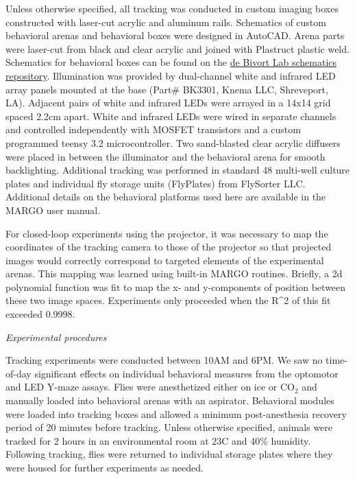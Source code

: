 \documentclass[10pt]{article}
\begin{document}
\begin{multicols}{2}
Unless otherwise specified, all tracking was conducted in custom imaging boxes constructed with laser-cut acrylic and aluminum rails. Schematics of custom behavioral arenas and behavioral boxes were designed in AutoCAD. Arena parts were laser-cut from black and clear acrylic and joined with Plastruct plastic weld. Schematics for behavioral boxes can be found on the \href{https://github.com/de-Bivort-Lab/dblab-schematics}{de Bivort Lab schematics repository}. Illumination was provided by dual-channel white and infrared LED array panels mounted at the base (Part# BK3301, Knema LLC, Shreveport, LA). Adjacent pairs of white and infrared LEDs were arrayed in a 14x14 grid spaced 2.2cm apart. White and infrared LEDs were wired in separate channels and controlled independently with MOSFET transistors and a custom programmed teensy 3.2 microcontroller. Two sand-blasted clear acrylic diffusers were placed in between the illuminator and the behavioral arena for smooth backlighting. Additional tracking was performed in standard 48 multi-well culture plates and individual fly storage units (FlyPlates) from FlySorter LLC. Additional details on the behavioral platforms used here are available in the MARGO user manual.

For closed-loop experiments using the projector, it was necessary to map the coordinates of the tracking camera to those of the projector so that projected images would correctly correspond to targeted elements of the experimental arenas. This mapping was learned using built-in MARGO routines. Briefly, a 2d polynomial function was fit to map the x- and y-components of position between these two image spaces. Experiments only proceeded when the R^{2} of this fit exceeded 0.9998. 

\vspace*{0.5cm}
\noindent\textit{Experimental procedures}
\vspace*{0.3cm}

Tracking experiments were conducted between 10AM and 6PM. We saw no time-of-day significant effects on individual behavioral measures from the optomotor and LED Y-maze assays.  Flies were anesthetized either on ice or CO$_{2}$ and manually loaded into behavioral arenas with an aspirator. Behavioral modules were loaded into tracking boxes and allowed a minimum post-anesthesia recovery period of 20 minutes before tracking. Unless otherwise specified, animals were tracked for 2 hours in an environmental room at 23\degree  C and 40\% humidity. Following tracking, flies were returned to individual storage plates where they were housed for further experiments as needed.


\end{multicols}
\end{document}
